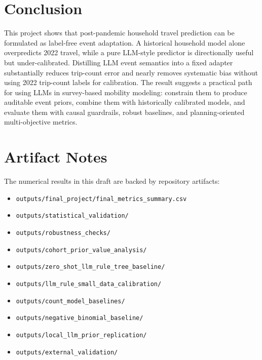\documentclass[11pt]{article}
\begin{document}
\section{Conclusion}

This project shows that post-pandemic household travel prediction can be formulated as label-free event adaptation.
A historical household model alone overpredicts 2022 travel, while a pure LLM-style predictor is directionally useful but under-calibrated.
Distilling LLM event semantics into a fixed adapter substantially reduces trip-count error and nearly removes systematic bias without using 2022 trip-count labels for calibration.
The result suggests a practical path for using LLMs in survey-based mobility modeling: constrain them to produce auditable event priors, combine them with historically calibrated models, and evaluate them with causal guardrails, robust baselines, and planning-oriented multi-objective metrics.

\section*{Artifact Notes}

The numerical results in this draft are backed by repository artifacts:
\begin{itemize}
    \item \texttt{outputs/final\_project/final\_metrics\_summary.csv}
    \item \texttt{outputs/statistical\_validation/}
    \item \texttt{outputs/robustness\_checks/}
    \item \texttt{outputs/cohort\_prior\_value\_analysis/}
    \item \texttt{outputs/zero\_shot\_llm\_rule\_tree\_baseline/}
    \item \texttt{outputs/llm\_rule\_small\_data\_calibration/}
    \item \texttt{outputs/count\_model\_baselines/}
    \item \texttt{outputs/negative\_binomial\_baseline/}
    \item \texttt{outputs/local\_llm\_prior\_replication/}
    \item \texttt{outputs/external\_validation/}
\end{itemize}



\end{document}
